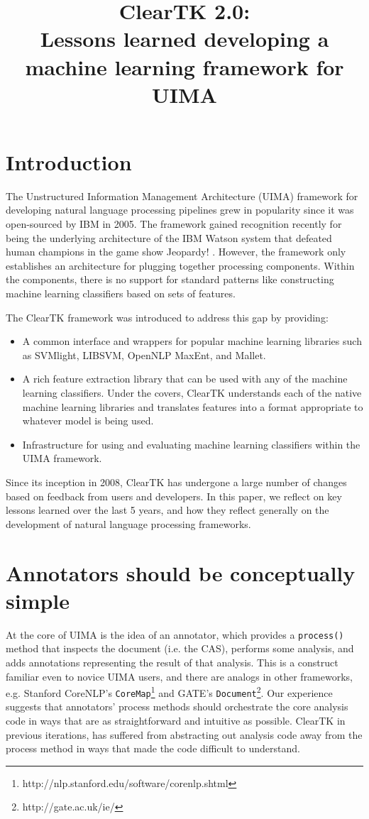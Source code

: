 \documentclass[10pt, a4paper]{article}
\title{ClearTK 2.0:\\ Lessons learned developing a machine learning framework for UIMA}
\newcommand{\code}[1]{\texttt{\small #1}}
\begin{document}
\maketitleabstract

\section{Introduction}
The Unstructured Information Management Architecture (UIMA) framework for developing natural language processing pipelines grew in popularity since it was open-sourced by IBM in 2005.
The framework gained recognition recently for being the underlying architecture of the IBM Watson system that defeated human champions in the game show Jeopardy! \cite{ferrucci_building_2010}.
However, the framework only establishes an architecture for plugging together processing components.
Within the components, there is no support for standard patterns like constructing machine learning classifiers based on sets of features.

The ClearTK framework was introduced to address this gap \cite{ogren-etal:2008:UIMA-LREC,ogren-etal:2009:UIMA-GSCL} by providing:
\begin{itemize}
\item A common interface and wrappers for popular machine learning libraries such as SVMlight, LIBSVM, OpenNLP MaxEnt, and Mallet.
\item A rich feature extraction library that can be used with any of the machine learning classifiers. Under the covers, ClearTK understands each of the native machine learning libraries and translates features into a format appropriate to whatever model is being used.
\item Infrastructure for using and evaluating machine learning classifiers within the UIMA framework.
\end{itemize}

Since its inception in 2008, ClearTK has undergone a large number of changes based on feedback from users and developers.
In this paper, we reflect on key lessons learned over the last 5 years, and how they reflect generally on the development of natural language processing frameworks.

\section{Annotators should be conceptually simple}
\label{sec:annotators}
At the core of UIMA is the idea of an annotator, which provides a \code{process()} method that inspects the document (i.e. the CAS), performs some analysis, and adds annotations representing the result of that analysis.  This is a construct familiar even to novice UIMA users, and there are analogs in other frameworks, e.g. Stanford CoreNLP's \code{CoreMap}\footnote{http://nlp.stanford.edu/software/corenlp.shtml} and GATE's \code{Document}\footnote{http://gate.ac.uk/ie/}.  Our experience suggests that annotators' process methods should orchestrate the core analysis code in ways that are as straightforward and intuitive as possible.  ClearTK in previous iterations, has suffered from abstracting out analysis code away from the process method in ways that made the code difficult to understand.  
\end{document}
